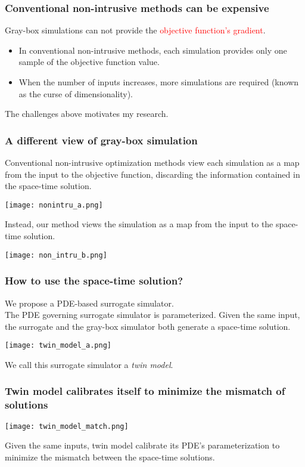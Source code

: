 \documentclass{beamer}
\begin{document}
\begin{frame}
    \frametitle{Conventional non-intrusive methods can be expensive}
    Gray-box simulations can not provide the \textcolor{red}{objective function's gradient}.
    \begin{itemize}
            \item In conventional non-intrusive methods, each simulation
                  provides only one sample of the objective function value.
            \item When the number of
                  inputs increases, more simulations are required (known as the curse of dimensionality).
    \end{itemize}
    \vspace{0.2cm}
    The challenges above motivates my research.
\end{frame}

\begin{frame}
    \frametitle{A different view of gray-box simulation}
        Conventional non-intrusive optimization methods view each simulation
        as a map from the input to the objective function, discarding
        the information  contained in the space-time solution.
        \begin{center}
            \texttt{[image: nonintru\_a.png]}
        \end{center}
        Instead, our method views the simulation as a map from the input to the
        space-time solution.
        \begin{center}
            \texttt{[image: non\_intru\_b.png]}
        \end{center}
\end{frame}

\begin{frame}
    \frametitle{How to use the space-time solution?}
        We propose a PDE-based surrogate simulator.\\
        The PDE governing surrogate simulator is parameterized. Given 
        the same input, the surrogate and the gray-box simulator both generate
        a space-time solution.
        \begin{center}
            \texttt{[image: twin\_model\_a.png]}
        \end{center}
        We call this surrogate simulator a \emph{twin model}.
\end{frame}

\begin{frame}
    \frametitle{Twin model calibrates itself to minimize the mismatch of solutions}
    \begin{center}
        \texttt{[image: twin\_model\_match.png]}
    \end{center}
    Given the same inputs, twin model calibrate its PDE's parameterization to
    minimize the mismatch between the space-time solutions. 
\end{frame}
\end{document}
